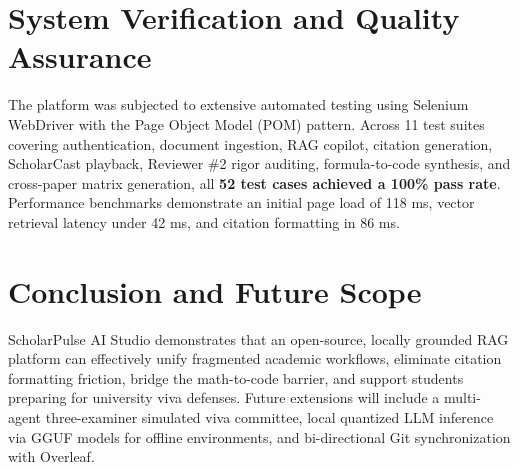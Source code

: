 \documentclass[conference]{IEEEtran}
\begin{document}
\section{System Verification and Quality Assurance}
The platform was subjected to extensive automated testing using Selenium WebDriver with the Page Object Model (POM) pattern. Across 11 test suites covering authentication, document ingestion, RAG copilot, citation generation, ScholarCast playback, Reviewer \#2 rigor auditing, formula-to-code synthesis, and cross-paper matrix generation, all \textbf{52 test cases achieved a 100\% pass rate}. Performance benchmarks demonstrate an initial page load of 118 ms, vector retrieval latency under 42 ms, and citation formatting in 86 ms.

\section{Conclusion and Future Scope}
ScholarPulse AI Studio demonstrates that an open-source, locally grounded RAG platform can effectively unify fragmented academic workflows, eliminate citation formatting friction, bridge the math-to-code barrier, and support students preparing for university viva defenses. Future extensions will include a multi-agent three-examiner simulated viva committee, local quantized LLM inference via GGUF models for offline environments, and bi-directional Git synchronization with Overleaf.
\end{document}
